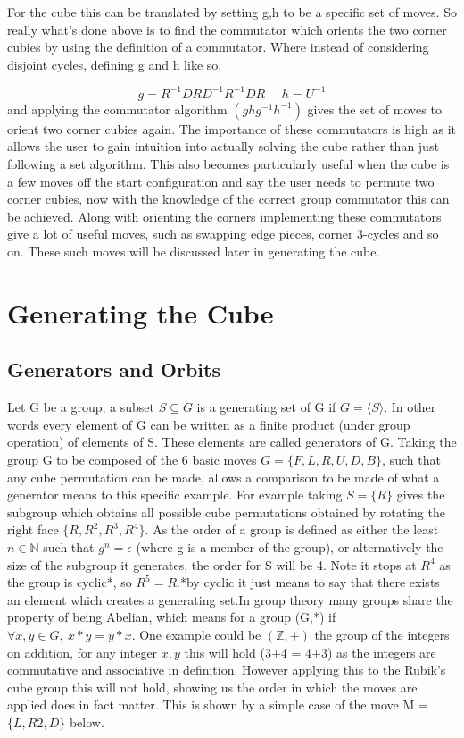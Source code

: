 \documentclass{article}
\newcounter{theo}[section]\setcounter{theo}{0}
\newcounter{prop}[section]\setcounter{prop}{0}
\newcounter{lem}[section]\setcounter{lem}{0}
\begin{document}
For the cube this can be translated by setting g,h to be a specific set of moves. So really what's done above is to find the commutator which orients the two corner cubies by using the definition of a commutator. Where instead of considering disjoint cycles, defining g and h like so,

\begin{equation}\label{orient}
	g = R^{-1}DRD^{-1}R^{-1}DR\ \ \ \ \ \ 
    h = U^{-1}
\end{equation}
and applying the commutator algorithm $(ghg^{-1}h^{-1})$ gives the set of moves to orient two corner cubies again. The importance of these commutators is high as it allows the user to gain intuition into actually solving the cube rather than just following a set algorithm. This also becomes particularly useful when the cube is a few moves off the start configuration and say the user needs to permute two corner cubies, now with the knowledge of the correct group commutator this can be achieved. Along with orienting the corners implementing these commutators give a lot of useful moves, such as swapping edge pieces, corner 3-cycles and so on. These such moves will be discussed later in generating the cube.

\section{Generating the Cube}
\subsection{Generators and Orbits}
Let G be a group, a subset $S\subseteq G$ is a generating set of G if $G =\langle S\rangle $. In other words every element of G can be written as a finite product (under group operation) of elements of S. These elements are called generators of G. Taking the group G to be composed of the 6 basic moves  $G= \{{F,L,R,U,D,B}\}$, such that  any cube permutation can be made, allows a comparison to be made of what a generator means to this specific example. For example taking $S=\{R\}$ gives the subgroup which obtains all possible cube permutations obtained by rotating the right face $\{R,R^2,R^3,R^4\}$. As the order of a group is defined as either the least $n \in \mathbb{N}$ such that $g^n = \epsilon$ (where g is a member of the group),  or alternatively the size of the subgroup it generates, the order for S will be 4. Note it stops at $R^4$ as the group is cyclic*, so $R^5= R$.*by cyclic it just means to say that there exists an element which creates a generating set.\newline In group theory many groups share the property of being Abelian, which means for a group (G,*) if $\forall x,y \in G,\ x*y=y*x$. One example could be $(\mathbb{Z},+)$ the group of the integers on addition, for any integer $x,y$ this will hold (3+4 = 4+3) as the integers are commutative and associative in definition.
However applying this to the Rubik's cube group this will not hold, showing us the order in which the moves are applied does in fact matter. This is shown by a simple case of the move M = $\{L,R2,D\}$ below.
\end{document}
